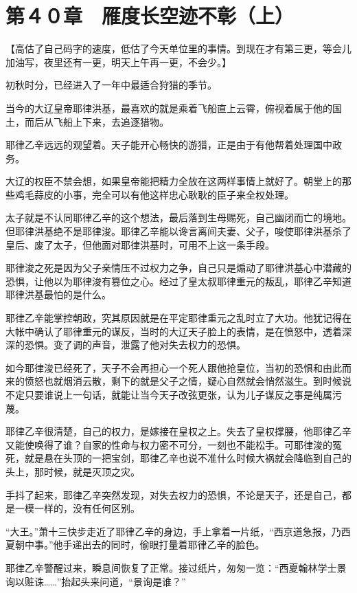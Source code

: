 \section{第４０章　雁度长空迹不彰（上）}

【高估了自己码字的速度，低估了今天单位里的事情。到现在才有第三更，等会儿加油写，夜里还有一更，明天上午再一更，不会少。】

初秋时分，已经进入了一年中最适合狩猎的季节。

当今的大辽皇帝耶律洪基，最喜欢的就是乘着飞船直上云霄，俯视着属于他的国土，而后从飞船上下来，去追逐猎物。

耶律乙辛远远的观望着。天子能开心畅快的游猎，正是由于有他帮着处理国中政务。

大辽的权臣不禁会想，如果皇帝能把精力全放在这两样事情上就好了。朝堂上的那些鸡毛蒜皮的小事，完全可以有他这样忠心耿耿的臣子来全权处理。

太子就是不认同耶律乙辛的这个想法，最后落到生母赐死，自己幽闭而亡的境地。但耶律洪基绝不是耶律浚。耶律乙辛能以谗言离间夫妻、父子，唆使耶律洪基杀了皇后、废了太子，但他面对耶律洪基时，可用不上这一条手段。

耶律浚之死是因为父子亲情压不过权力之争，自己只是煽动了耶律洪基心中潜藏的恐惧，让他以为耶律浚有篡位之心。经过了皇太叔耶律重元的叛乱，耶律乙辛知道耶律洪基最怕的是什么。

耶律乙辛能掌控朝政，究其原因就是在平定耶律重元之乱时立了大功。他犹记得在大帐中确认了耶律重元的谋反，当时的大辽天子脸上的表情，是在愤怒中，透着深深的恐惧。变了调的声音，泄露了他对失去权力的恐惧。

如今耶律浚已经死了，天子不会再担心一个死人跟他抢皇位，当初的恐惧和由此而来的愤怒也就烟消云散，剩下的就是父子之情，疑心自然就会悄然滋生。到时候说不定只要谁说上一句话，就能让当今天子改弦更张，认为儿子谋反之事是纯属污蔑。

耶律乙辛很清楚，自己的权力，是嫁接在皇权之上。失去了皇权撑腰，他耶律乙辛又能使唤得了谁？自家的性命与权力密不可分，一刻也不能松手。可耶律浚的冤死，就是悬在头顶的一把宝剑，耶律乙辛也说不准什么时候大祸就会降临到自己的头上，那时候，就是灭顶之灾。

手抖了起来，耶律乙辛突然发现，对失去权力的恐惧，不论是天子，还是自己，都是一模一样的，没有任何区别。

“大王。”萧十三快步走近了耶律乙辛的身边，手上拿着一片纸，“西京道急报，乃西夏朝中事。”他手递出去的同时，偷眼打量着耶律乙辛的脸色。

耶律乙辛警醒过来，瞬息间恢复了正常。接过纸片，匆匆一览：“西夏翰林学士景询以赃诛……”抬起头来问道，“景询是谁？”

